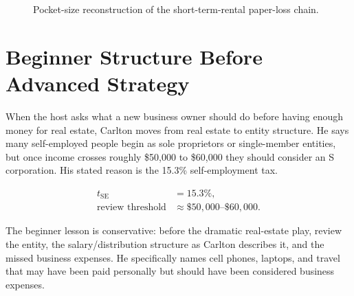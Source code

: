 \documentclass[11pt,oneside]{book}
\begin{document}
\begin{figure}
\centering
{}
\caption{Pocket-size reconstruction of the short-term-rental paper-loss chain.}
\label{fig:carlton-str-flow}
\end{figure}

\section{Beginner Structure Before Advanced Strategy}

When the host asks what a new business owner should do before having enough money for real estate, Carlton moves from real estate to entity structure. He says many self-employed people begin as sole proprietors or single-member entities, but once income crosses roughly \$50,000 to \$60,000 they should consider an S corporation. His stated reason is the 15.3\% self-employment tax.

\begin{align}
t_{\mathrm{SE}} &= 15.3\%,\\
\text{review threshold} &\approx \$50{,}000\text{--}\$60{,}000.
\end{align}

The beginner lesson is conservative: before the dramatic real-estate play, review the entity, the salary/distribution structure as Carlton describes it, and the missed business expenses. He specifically names cell phones, laptops, and travel that may have been paid personally but should have been considered business expenses.
\end{document}
